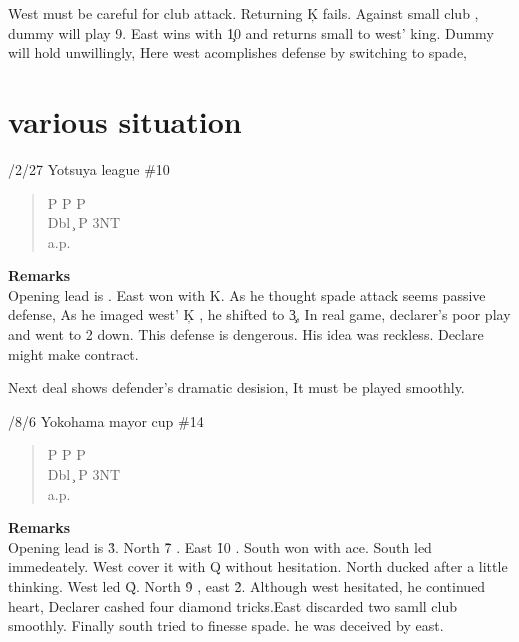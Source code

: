{West must be careful for club attack.
Returning \c K fails. Against small club , dummy will play 9.
East wins with \c 10 and returns small to west' king.
Dummy will hold unwillingly, Here west acomplishes defense by
switching to spade,


\section{various situation}  %

/2/27 Yotsuya league \#10
\begin{quote}
%
  {}%
  {}%
  {}%
  {}%
\end{quote}
\begin{quote}
\begin{bidding}
P \> P \> P \d  \\
Dbl \c \> P \> 3NT \\
a.p.
\end{bidding}
 \end{quote}

{\bf Remarks}\\

Opening lead is .
East won with \s K. As he thought spade attack seems passive defense,
As he imaged west' \c K , he shifted to \c 3, In real game, declarer's
poor play and went to 2 down. This defense is dengerous. His idea was 
reckless. Declare might make contract.
 
}


Next deal shows defender's dramatic desision, It must
be played smoothly.

/8/6 Yokohama mayor cup \#14
\begin{quote}
%
  {}%
  {}%
  {}%
  {}%
\end{quote}
\begin{quote}
\begin{bidding}
P \> P \> P \d  \\
Dbl \c \> P \> 3NT \\
a.p.
\end{bidding}
 \end{quote}
{\bf Remarks}\\
Opening lead is \h 3. North \h7 . East \h10 . South won with ace.
South led  immedeately. West cover it with \s Q without
hesitation. North ducked after a little thinking. West led \h Q.
North \h 9 , east \h 2. Although west hesitated, he continued heart,
Declarer cashed four diamond tricks.East discarded two samll club
smoothly. Finally south tried to finesse spade. he was deceived by east.

